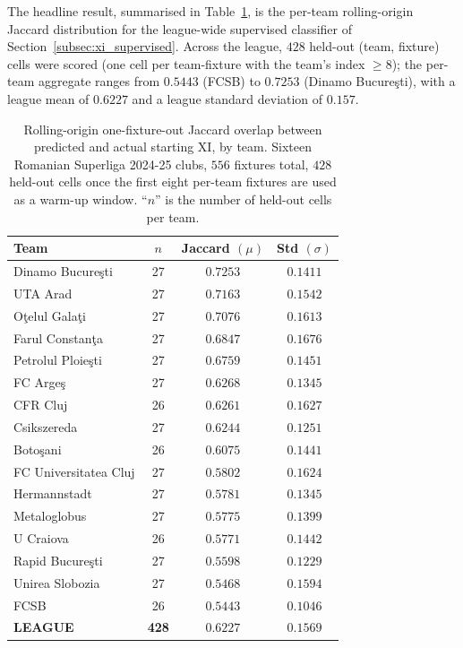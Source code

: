 The headline result, summarised in Table~\ref{tab:xi_validation_perteam}, is the per-team rolling-origin Jaccard distribution for the league-wide supervised classifier of Section~\ref{subsec:xi_supervised}. Across the league, $428$ held-out (team, fixture) cells were scored (one cell per team-fixture with the team's index $\geq 8$); the per-team aggregate ranges from $0.5443$ (FCSB) to $0.7253$ (Dinamo Bucureşti), with a league mean of $\mathbf{0.6227}$ and a league standard deviation of $0.157$.

\begin{table}[htbp]
\centering
\caption{Rolling-origin one-fixture-out Jaccard overlap between predicted and actual starting XI, by team. Sixteen Romanian Superliga 2024-25 clubs, $556$ fixtures total, $428$ held-out cells once the first eight per-team fixtures are used as a warm-up window. ``$n$'' is the number of held-out cells per team.}
\label{tab:xi_validation_perteam}
\begin{tabular}{|l|c|c|c|}
\hline
\textbf{Team} & $n$ & \textbf{Jaccard $(\mu)$} & \textbf{Std $(\sigma)$} \\
\hline
Dinamo Bucureşti      & 27 & $0.7253$ & $0.1411$ \\
\hline
UTA Arad              & 27 & $0.7163$ & $0.1542$ \\
\hline
Oţelul Galaţi         & 27 & $0.7076$ & $0.1613$ \\
\hline
Farul Constanţa       & 27 & $0.6847$ & $0.1676$ \\
\hline
Petrolul Ploieşti     & 27 & $0.6759$ & $0.1451$ \\
\hline
FC Argeş              & 27 & $0.6268$ & $0.1345$ \\
\hline
CFR Cluj              & 26 & $0.6261$ & $0.1627$ \\
\hline
Csikszereda           & 27 & $0.6244$ & $0.1251$ \\
\hline
Botoşani              & 26 & $0.6075$ & $0.1441$ \\
\hline
FC Universitatea Cluj & 27 & $0.5802$ & $0.1624$ \\
\hline
Hermannstadt          & 27 & $0.5781$ & $0.1345$ \\
\hline
Metaloglobus          & 27 & $0.5775$ & $0.1399$ \\
\hline
U Craiova             & 26 & $0.5771$ & $0.1442$ \\
\hline
Rapid Bucureşti       & 27 & $0.5598$ & $0.1229$ \\
\hline
Unirea Slobozia       & 27 & $0.5468$ & $0.1594$ \\
\hline
FCSB                  & 26 & $0.5443$ & $0.1046$ \\
\hline
\textbf{LEAGUE}       & \textbf{428} & $\mathbf{0.6227}$ & $\mathbf{0.1569}$ \\
\hline
\end{tabular}
\end{table}

